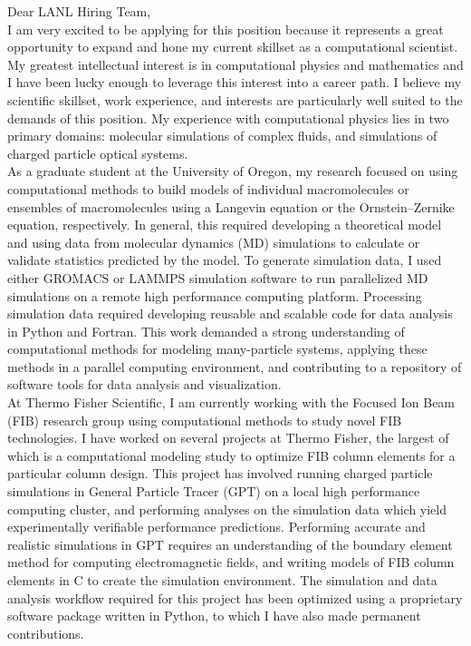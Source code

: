 \documentclass[]{letter}
\begin{document}

Dear LANL Hiring Team, \\

I am very excited to be applying for this position because it represents a great opportunity to expand and hone my current skillset as a computational scientist. My greatest intellectual interest is in computational physics and mathematics and I have been lucky enough to leverage this interest into a career path. I believe my scientific skillset, work experience, and interests are particularly well suited to the demands of this position. My experience with computational physics lies in two primary domains: molecular simulations of complex fluids, and simulations of charged particle optical systems. \\

As a graduate student at the University of Oregon, my research focused on using computational methods to build models of individual macromolecules or ensembles of macromolecules using a Langevin equation or the Ornstein–Zernike equation, respectively. In general, this required developing a theoretical model and using data from molecular dynamics (MD) simulations to calculate or validate statistics predicted by the model. To generate simulation data, I used either GROMACS or LAMMPS simulation software to run parallelized MD simulations on a remote high performance computing platform. Processing simulation data required developing reusable and scalable code for data analysis in Python and Fortran. This work demanded a strong understanding of computational methods for modeling many-particle systems, applying these methods in a parallel computing environment, and contributing to a repository of software tools for data analysis and visualization. \\

At Thermo Fisher Scientific, I am currently working with the Focused Ion Beam (FIB) research group using computational methods to study novel FIB technologies. I have worked on several projects at Thermo Fisher, the largest of which is a computational modeling study to optimize FIB column elements for a particular column design. This project has involved running charged particle simulations in General Particle Tracer (GPT) on a local high performance computing cluster, and performing analyses on the simulation data which yield experimentally verifiable performance predictions. Performing accurate and realistic simulations in GPT requires an understanding of the boundary element method for computing electromagnetic fields, and writing models of FIB column elements in C to create the simulation environment. The simulation and data analysis workflow required for this project has been optimized using a proprietary software package written in Python, to which I have also made permanent contributions. \\
\end{document}
